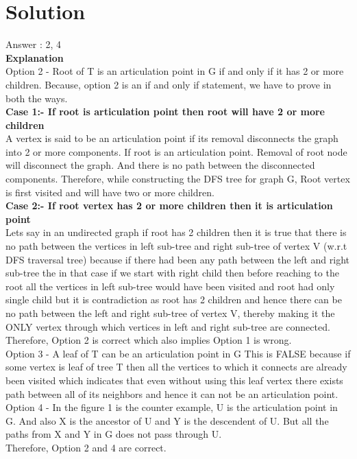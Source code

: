 \documentclass[journal,12pt,twocolumn]{IEEEtran}
\begin{document}
\section{Solution}
Answer : 2, 4
\\
\textbf{Explanation}
\\
Option 2 - Root of T is an articulation point in G if and only if it has 2 or more children. Because, option 2 is an if and only if statement, we have to prove in both the ways. 
\\
\textbf{Case 1:- If root is articulation point then root will have 2 or more children}\\
A vertex is said to be an articulation point if its removal disconnects the graph into 2 or more components. If root is an articulation point. Removal of root node will disconnect the graph. And there is no path between the disconnected components. Therefore, while constructing the DFS tree for graph G, Root vertex is first visited and will have two or more children. 
\\
\textbf{Case 2:- If root vertex has 2 or more children then it is articulation point}\\
Lets say in an undirected graph if root has 2 children then it is true that there is no path between the vertices in left sub-tree and right sub-tree of vertex V (w.r.t DFS traversal tree) because if there had been any path between the left and right sub-tree the in that case if we start with right child then before reaching to the root all the vertices in left sub-tree would have been visited and root had only single child but it is contradiction as root has 2 children and hence there can be no path between the left and right sub-tree of vertex V, thereby making it the ONLY vertex through which vertices in left and right sub-tree are connected.
\\ 
Therefore, Option 2 is correct which also implies Option 1 is wrong.\\
Option 3 - A leaf of T can be an articulation point in G
 This is FALSE because if some vertex is leaf of tree T then all the vertices to which it connects are already been visited which indicates that even without using this leaf vertex there exists path between all of its neighbors and hence it can not be an articulation point.
 \\
 Option 4 - In the figure 1 is the counter example, U is the articulation point in G. And also X is the ancestor of U and Y is the descendent of U. But all the paths from X and Y in G does not pass through U.
\\
Therefore, Option 2 and 4 are correct.\\
\end{document}
